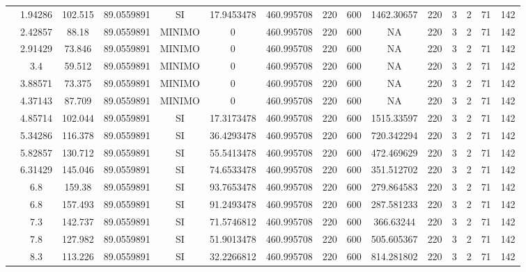 \begin{table}[H]
{\begin{tabular}{|c|c|c|c|c|c|c|c|c|c|c|c|c|c|c|}
\cline{2-15}    & 1.94286 & 102.515 & 89.0559891 & SI  & 17.9453478 & 460.995708 & 220 & 600 & 1462.30657 & 220 & 3   & 2   & 71  & 142 \bigstrut\\
\cline{2-15}    & 2.42857 & 88.18 & 89.0559891 & MINIMO & 0   & 460.995708 & 220 & 600 & NA  & 220 & 3   & 2   & 71  & 142 \bigstrut\\
\cline{2-15}    & 2.91429 & 73.846 & 89.0559891 & MINIMO & 0   & 460.995708 & 220 & 600 & NA  & 220 & 3   & 2   & 71  & 142 \bigstrut\\
\cline{2-15}    & 3.4 & 59.512 & 89.0559891 & MINIMO & 0   & 460.995708 & 220 & 600 & NA  & 220 & 3   & 2   & 71  & 142 \bigstrut\\
\cline{2-15}    & 3.88571 & 73.375 & 89.0559891 & MINIMO & 0   & 460.995708 & 220 & 600 & NA  & 220 & 3   & 2   & 71  & 142 \bigstrut\\
\cline{2-15}    & 4.37143 & 87.709 & 89.0559891 & MINIMO & 0   & 460.995708 & 220 & 600 & NA  & 220 & 3   & 2   & 71  & 142 \bigstrut\\
\cline{2-15}    & 4.85714 & 102.044 & 89.0559891 & SI  & 17.3173478 & 460.995708 & 220 & 600 & 1515.33597 & 220 & 3   & 2   & 71  & 142 \bigstrut\\
\cline{2-15}    & 5.34286 & 116.378 & 89.0559891 & SI  & 36.4293478 & 460.995708 & 220 & 600 & 720.342294 & 220 & 3   & 2   & 71  & 142 \bigstrut\\
\cline{2-15}    & 5.82857 & 130.712 & 89.0559891 & SI  & 55.5413478 & 460.995708 & 220 & 600 & 472.469629 & 220 & 3   & 2   & 71  & 142 \bigstrut\\
\cline{2-15}    & 6.31429 & 145.046 & 89.0559891 & SI  & 74.6533478 & 460.995708 & 220 & 600 & 351.512702 & 220 & 3   & 2   & 71  & 142 \bigstrut\\
\cline{2-15}    & 6.8 & 159.38 & 89.0559891 & SI  & 93.7653478 & 460.995708 & 220 & 600 & 279.864583 & 220 & 3   & 2   & 71  & 142 \bigstrut\\
\cline{2-15}    & 6.8 & 157.493 & 89.0559891 & SI  & 91.2493478 & 460.995708 & 220 & 600 & 287.581233 & 220 & 3   & 2   & 71  & 142 \bigstrut\\
\cline{2-15}    & 7.3 & 142.737 & 89.0559891 & SI  & 71.5746812 & 460.995708 & 220 & 600 & 366.63244 & 220 & 3   & 2   & 71  & 142 \bigstrut\\
\cline{2-15}    & 7.8 & 127.982 & 89.0559891 & SI  & 51.9013478 & 460.995708 & 220 & 600 & 505.605367 & 220 & 3   & 2   & 71  & 142 \bigstrut\\
\cline{2-15}    & 8.3 & 113.226 & 89.0559891 & SI  & 32.2266812 & 460.995708 & 220 & 600 & 814.281802 & 220 & 3   & 2   & 71  & 142 \bigstrut\\

\end{tabular}}
\end{table}
